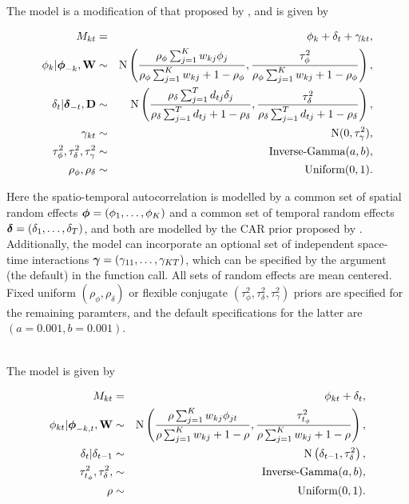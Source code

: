 \documentclass[article,shortnames,nojss]{jss}
\newcommand{\bd}[1]{\ensuremath{\mbox{\boldmath $#1$}}}
\begin{document}
\\
The model is a  modification of that proposed by \cite{knorrheld2000}, and is given by

\begin{eqnarray}
M_{kt}&=&\phi_k +  \delta_t   + \gamma_{kt},\label{caranova}\nonumber\\
\phi_k|\bd{\phi}_{-k},\mathbf{W}&\sim&\mbox{N}\left(\frac{\rho_{\phi}\sum_{j=1}^Kw_{kj}\phi_j}{\rho_{\phi}\sum_{j=1}^Kw_{kj} + 1-\rho_{\phi}}, \frac{\tau^2_{\phi}}{\rho_{\phi}\sum_{j=1}^Kw_{kj} + 1-\rho_{\phi}}\right),\nonumber\\
\delta_t|\bd{\delta}_{-t},\mathbf{D}&\sim&\mbox{N}\left(\frac{\rho_{\delta}\sum_{j=1}^T d_{tj}\delta_j}{\rho_{\delta}\sum_{j=1}^T d_{tj} + 1-\rho_{\delta}}, \frac{\tau^2_{\delta}}{\rho_{\delta}\sum_{j=1}^T d_{tj}+1-\rho_{\delta}}\right),\nonumber\\
\gamma_{kt}&\sim&\mbox{N}(0, \tau^2_{\gamma} ),\nonumber\\
\tau^2_{\phi}, \tau^2_{\delta}, \tau^2_{\gamma}&\sim&\mbox{Inverse-Gamma}(a,b),\nonumber\\
\rho_{\phi},\rho_{\delta}&\sim&\mbox{Uniform}(0,1).\nonumber
\end{eqnarray}


Here the spatio-temporal autocorrelation is modelled by a common set of spatial random effects $\bd{\phi}=(\phi_1,\ldots,\phi_K)$ and a common set of temporal random effects  $\bd{\delta}=(\delta_1,\ldots,\delta_T)$, and both are modelled by the CAR prior proposed by \cite{leroux1999}. Additionally, the model can incorporate an optional set of independent space-time interactions $\bd{\gamma}=(\gamma_{11},\ldots,\gamma_{KT})$, which can be specified by the argument  (the default) in the function call. All sets of random effects are mean centered. Fixed uniform $(\rho_{\phi},\rho_{\delta})$  or flexible  conjugate $(\tau^2_{\phi}, \tau^2_{\delta}, \tau^2_{\gamma})$ priors are specified for the remaining paramters, and the default specifications for the latter are $(a=0.001, b=0.001)$.\vspace{1cm}


\\
The model is given by

\begin{eqnarray}
M_{kt}&=&\phi_{kt} +  \delta_t,\label{carsepspat}\nonumber\\
\phi_{kt}|\bd{\phi}_{-k,t},\mathbf{W}&\sim&\mbox{N}\left(\frac{\rho\sum_{j=1}^Kw_{kj}\phi_{jt}}{\rho\sum_{j=1}^Kw_{kj} + 1-\rho},\frac{\tau^2_{t_{\phi}}}{\rho\sum_{j=1}^Kw_{kj} + 1-\rho}\right),\nonumber\\
\delta_t|\delta_{t-1}&\sim&\mbox{N}\left(\delta_{t-1}, \tau^2_{\delta}\right),\nonumber\\
\tau^2_{t_{\phi}}, \tau^2_{\delta}, &\sim&\mbox{Inverse-Gamma}(a,b),\nonumber\\
\rho&\sim&\mbox{Uniform}(0,1).\nonumber
\end{eqnarray}
\end{document}
